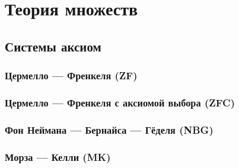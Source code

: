 \chapter{Теория множеств}

\section{Системы аксиом}
\subsection{Цермелло --- Френкеля (ZF)}
\subsection{Цермелло --- Френкеля с аксиомой выбора (ZFC)}
\subsection{Фон Неймана --- Бернайса --- Гёделя (NBG)}
\subsection{Морза --- Келли (MK)}
